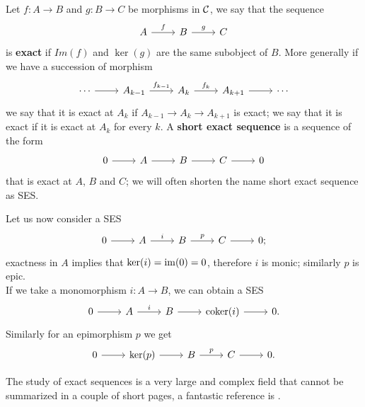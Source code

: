 \begin{definition}
	Let $f\colon A\longrightarrow B$ and $g\colon B \longrightarrow C$ be morphisms in $\mathcal{C}$, we say that the sequence 
	\[\begin{tikzcd}
		A & B & C
		\arrow["f", from=1-1, to=1-2]
		\arrow["g", from=1-2, to=1-3]
	\end{tikzcd}\]
	is \textbf{exact} if $Im(f)$ and $\ker(g)$ are the same subobject of $B$. More generally if we have a succession of morphism 
	\[\begin{tikzcd}
		\cdots & {A_{k-1}} & {A_k} & {A_{k+1}} & \cdots
		\arrow[from=1-1, to=1-2]
		\arrow["{f_{k-1}}", from=1-2, to=1-3]
		\arrow["{f_k}", from=1-3, to=1-4]
		\arrow[from=1-4, to=1-5]
	\end{tikzcd}\]
	we say that it is exact at $A_k$ if $A_{k-1}\longrightarrow A_k \longrightarrow A_{k+1}$ is exact; we say that it is exact if it is exact at $A_k$ for every $k$. A \textbf{short exact sequence} is a sequence of the form
	\[\begin{tikzcd}
		0 & A & B & C & 0
		\arrow[from=1-1, to=1-2]
		\arrow[from=1-2, to=1-3]
		\arrow[from=1-3, to=1-4]
		\arrow[from=1-4, to=1-5]
	\end{tikzcd}\]
	that is exact at $A$, $B$ and $C$; we will often shorten the name short exact sequence as SES.
\end{definition}

Let us now consider a SES
\[\begin{tikzcd}
	0 & A & B & C & {0;}
	\arrow[from=1-1, to=1-2]
	\arrow["i", from=1-2, to=1-3]
	\arrow["p", from=1-3, to=1-4]
	\arrow[from=1-4, to=1-5]
\end{tikzcd}\]
exactness in $A$ implies that $\ker(i) = \operatorname{im}(0) = 0$, therefore $i$ is monic; similarly $p$ is epic. \\
If we take a monomorphism $i\colon A \longrightarrow B$, we can obtain a SES 
\[\begin{tikzcd}
	0 & A & B & {\coker(i)} & {0.}
	\arrow[from=1-1, to=1-2]
	\arrow["i", from=1-2, to=1-3]
	\arrow[from=1-3, to=1-4]
	\arrow[from=1-4, to=1-5]
\end{tikzcd}\]
Similarly for an epimorphism $p$ we get
\[\begin{tikzcd}
	0 & {\ker(p)} & B & C & {0.}
	\arrow[from=1-1, to=1-2]
	\arrow[from=1-2, to=1-3]
	\arrow["p", from=1-3, to=1-4]
	\arrow[from=1-4, to=1-5]
\end{tikzcd}\]

The study of exact sequences is a very large and complex field that cannot be summarized in a couple of short pages, a fantastic reference is \cite{Weibel_1994}. 


